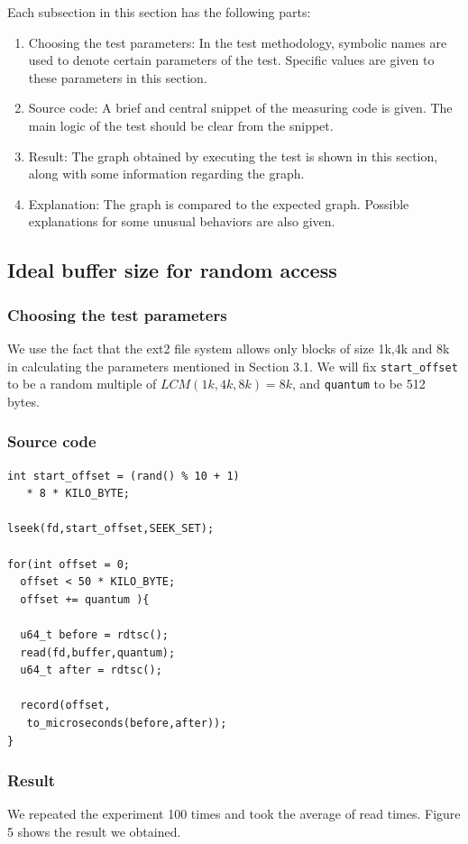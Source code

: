 \documentclass[twocolumn,11pt]{article}
\newcommand{\chumma}[1]{\subsubsection {#1}}
\begin{document}
\begin{sloppypar}
Each subsection in this section has the following parts:
\begin{enumerate}
	\item Choosing the test parameters: In the test methodology, symbolic
	names are used to denote certain parameters of the test. Specific
	values are given to these parameters in this section.
	\item Source code: A brief and central snippet of the measuring code
	is given. The main logic of the test should be clear from the snippet.
	\item Result: The graph obtained by executing the test is shown in this
	section, along with some information regarding the graph.
	\item Explanation: The graph is compared to the expected graph. Possible
	explanations for some unusual behaviors are also given.
\end{enumerate}

\subsection{Ideal buffer size for random access}

\chumma{Choosing the test parameters}
We use the fact that the ext2 file system allows only blocks of size 1k,4k and 8k
in calculating the parameters mentioned in Section 3.1. We will fix {\tt start\_offset}
to be a random multiple of $LCM(1k,4k,8k) = 8k$, and {\tt quantum} to be 512 bytes.

\chumma{Source code}
\begin{lstlisting}[frame=single]
int start_offset = (rand() % 10 + 1)
   * 8 * KILO_BYTE;

lseek(fd,start_offset,SEEK_SET);

for(int offset = 0;
  offset < 50 * KILO_BYTE;
  offset += quantum ){
  
  u64_t before = rdtsc();
  read(fd,buffer,quantum);
  u64_t after = rdtsc();

  record(offset,
   to_microseconds(before,after));
}
\end{lstlisting}


\chumma{Result}

We repeated the experiment 100 times and took the average of read times.
Figure 5 shows the result we obtained.


\end{sloppypar}
\end{document}
